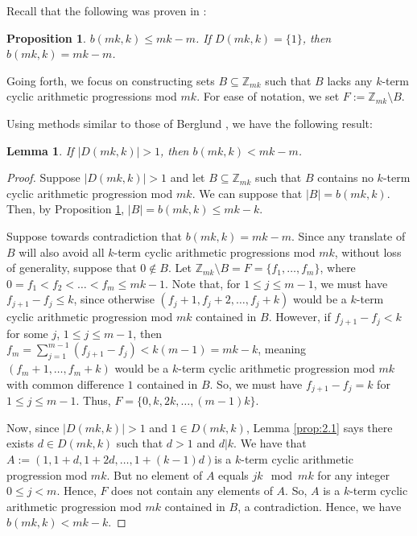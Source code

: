 \documentclass{article}
\newtheorem{lemma}[theorem]{Lemma}
\newtheorem{proposition}[theorem]{Proposition}
\theoremstyle{definition}
\theoremstyle{remark}
\begin{document}
Recall that the following was proven in \cite{Berglund}:

\begin{proposition}
 \label{prop:1.1}
$b(mk,k) \leq mk-m$. If $D(mk,k) = \{1\}$, then $b(mk,k) = mk-m$.
\end{proposition}

Going forth, we focus on constructing sets $B \subseteq \mathbb{Z}_{mk}$ such that $B$ lacks any $k$-term cyclic arithmetic progressions mod $mk$. For ease of notation, we set $F := \mathbb{Z}_{mk} \setminus B$. 

Using methods similar to those of Berglund \cite{Berglund}, we have the following result:

\begin{lemma}
\label{lem:2.1}
    If $|D(mk,k)| > 1$, then $b(mk,k) < mk-m$.
\end{lemma}

\begin{proof}
 Suppose $|D(mk,k)| > 1$ and let $B \subseteq \mathbb{Z}_{mk}$ such that $B$ contains no $k$-term cyclic arithmetic progression mod $mk$. We can suppose that $|B| = b(mk,k)$. Then, by Proposition \ref{prop:1.1}, $|B| = b(mk,k) \leq mk-k$. 
 
 Suppose towards contradiction that $b(mk,k) = mk-m$. Since any translate of $B$ will also avoid all $k$-term cyclic arithmetic progressions mod $mk$, without loss of generality, suppose that $0 \not \in B$. Let $\mathbb{Z}_{mk} \setminus B = F = \{f_{1}, \ldots, f_{m}\}$, where $0 = f_{1} < f_{2} < \ldots < f_{m} \leq mk-1$. %
 Note that, for $1 \leq j \leq m-1$, we must have $f_{j+1} - f_{j} \leq k$, since otherwise $(f_{j}+1, f_{j}+2,\ldots,f_{j}+k)$ would be a $k$-term cyclic arithmetic progression mod $mk$ contained in $B$. However, if $f_{j+1}-f_{j} < k$ for some $j$, $1 \leq j \leq m-1$, then $f_{m} = \sum_{j=1}^{m-1} (f_{j+1}-f_{j}) < k(m-1) = mk-k$, meaning $(f_{m}+1, \ldots, f_{m}+k)$ would be a $k$-term cyclic arithmetic progression mod $mk$ with common difference $1$ contained in $B$. So, we must have $f_{j+1}-f_{j} = k$ for $1 \leq j \leq m-1$. Thus, $F = \{0,k,2k,\ldots,(m-1)k\}$.

 Now, since $|D(mk,k)| > 1$ and $1 \in D(mk,k)$, Lemma \ref{prop:2.1} says there exists $d \in D(mk,k)$ such that $d > 1$ and $d \vert k$. We have that $A:=(1,1+d,1+2d,\ldots,1+(k-1)d)$is a $k$-term cyclic arithmetic progression mod $mk$. But no element of $A$ equals $jk \mod mk$ for any integer $0 \leq j < m$. Hence, $F$ does not contain any elements of $A$. So, $A$ is a $k$-term cyclic arithmetic progression mod $mk$ contained in $B$, a contradiction. Hence, we have $b(mk,k) < mk-k$. \qedhere
 \end{proof}
\end{document}
